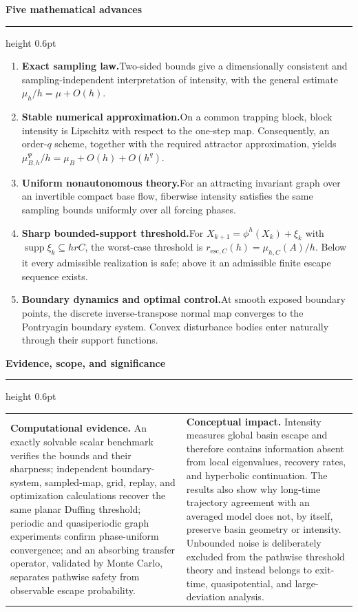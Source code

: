 \documentclass[pdflatex,sn-mathphys-num]{sn-jnl}
\numberwithin{equation}{section}
\newcommand{\pitchsection}[1]{%
  \vspace{0.65em}%
  {\large\bfseries\color{journalblue}#1}\par
  \vspace{0.18em}%
  {\color{rulegray}\hrule height 0.6pt}%
  \vspace{0.38em}%
}
\newcommand{\advanceitem}[2]{%
  \item \textbf{\color{journalblue}#1}\;#2%
}
\theoremstyle{thmstyleone}%
\theoremstyle{definition}
\theoremstyle{remark}
\begin{document}
\pitchsection{Five mathematical advances}

\begin{enumerate}[
  label=\textbf{\color{accentteal}\arabic*.},
  leftmargin=1.75em,
  itemsep=0.28em,
  topsep=0pt,
  parsep=0pt
]
  \advanceitem{Exact sampling law.}{Two-sided bounds give a dimensionally
  consistent and sampling-independent interpretation of intensity, with the
  general estimate $\mu_h/h=\mu+O(h)$.}

  \advanceitem{Stable numerical approximation.}{On a common trapping block,
  block intensity is Lipschitz with respect to the one-step map.  Consequently,
  an order-$q$ scheme, together with the required attractor approximation,
  yields $\mu_{B,h}^{\Psi}/h=\mu_B+O(h)+O(h^q)$.}

  \advanceitem{Uniform nonautonomous theory.}{For an attracting invariant graph
  over an invertible compact base flow, fiberwise intensity satisfies the same
  sampling bounds uniformly over all forcing phases.}

  \advanceitem{Sharp bounded-support threshold.}{For
  $X_{k+1}=\phi^h(X_k)+\xi_k$ with
  $\operatorname{supp}\xi_k\subseteq hrC$, the worst-case threshold is
  $r_{\mathrm{esc},C}(h)=\mu_{h,C}(A)/h$.  Below it every admissible realization
  is safe; above it an admissible finite escape sequence exists.}

  \advanceitem{Boundary dynamics and optimal control.}{At smooth exposed
  boundary points, the discrete inverse-transpose normal map converges to the
  Pontryagin boundary system.  Convex disturbance bodies enter naturally
  through their support functions.}
\end{enumerate}

\pitchsection{Evidence, scope, and significance}

\begin{tabularx}{\textwidth}{@{}>{\RaggedRight\arraybackslash}X@{\hspace{1.35em}}>{\RaggedRight\arraybackslash}X@{}}
  \textbf{Computational evidence.}
  An exactly solvable scalar benchmark verifies the bounds and their sharpness;
  independent boundary-system, sampled-map, grid, replay, and optimization
  calculations recover the same planar Duffing threshold; periodic and
  quasiperiodic graph experiments confirm phase-uniform convergence; and an
  absorbing transfer operator, validated by Monte Carlo, separates pathwise
  safety from observable escape probability.
  &
  \textbf{Conceptual impact.}
  Intensity measures global basin escape and therefore contains information
  absent from local eigenvalues, recovery rates, and hyperbolic continuation.
  The results also show why long-time trajectory agreement with an averaged
  model does not, by itself, preserve basin geometry or intensity.  Unbounded
  noise is deliberately excluded from the pathwise threshold theory and instead
  belongs to exit-time, quasipotential, and large-deviation analysis.
\end{tabularx}
\end{document}
